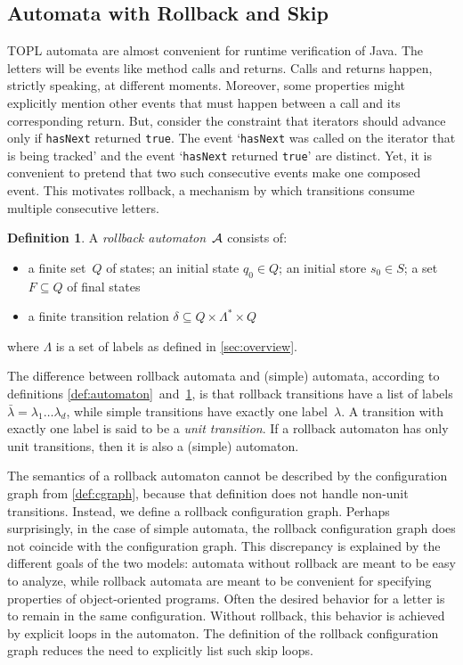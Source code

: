 \documentclass{article} %
\theoremstyle{definition}
\newtheorem{definition}{Definition}
\theoremstyle{remark}
\begin{document}
\subsection{Automata with Rollback and Skip} %

TOPL automata are almost convenient for runtime verification of Java.
The letters will be events like method calls and returns.
Calls and returns happen, strictly speaking, at different moments.
Moreover, some properties might explicitly mention other events that must happen between a call and its corresponding return.
But, consider the constraint that iterators should advance only if {\tt hasNext} returned {\tt true}.
The event `{\tt hasNext} was called on the iterator that is being tracked' and the event `{\tt hasNext} returned {\tt true}' are distinct.
Yet, it is convenient to pretend that two such consecutive events make one composed event.
This motivates rollback, a mechanism by which transitions consume multiple consecutive letters.

\begin{definition}\label{def:rollback}
A \emph{rollback automaton}~${\cal A}$ consists of:
\begin{itemize}
\item a finite set~$Q$ of states; an initial state $q_0\in Q$; an initial store $s_0\in S$; a set $F\subseteq Q$ of final states
\item a finite transition relation $\delta\subseteq Q\times\Lambda^*\times Q$
\end{itemize}
where $\Lambda$ is a set of labels as defined in \autoref{sec:overview}.
\end{definition}

The difference between rollback automata and (simple) automata, according to definitions \ref{def:automaton}~and~\ref{def:rollback}, is that rollback transitions have a list of labels $\bar\lambda=\lambda_1\ldots\lambda_d$, while simple transitions have exactly one label~$\lambda$.
A transition with exactly one label is said to be a \emph{unit transition}.
If a rollback automaton has only unit transitions, then it is also a (simple) automaton.

The semantics of a rollback automaton cannot be described by the configuration graph from \autoref{def:cgraph}, because that definition does not handle non-unit transitions.
Instead, we define a rollback configuration graph.
Perhaps surprisingly, in the case of simple automata, the rollback configuration graph does not coincide with the configuration graph.
This discrepancy is explained by the different goals of the two models: automata without rollback are meant to be easy to analyze, while rollback automata are meant to be convenient for specifying properties of object-oriented programs.
Often the desired behavior for a letter is to remain in the same configuration.
Without rollback, this behavior is achieved by explicit loops in the automaton.
The definition of the rollback configuration graph reduces the need to explicitly list such skip loops.
\end{document}
